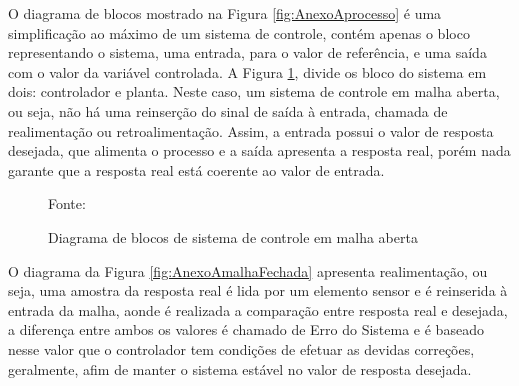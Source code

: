 O diagrama de blocos mostrado na Figura \ref{fig:AnexoAprocesso} é uma simplificação ao máximo de um sistema de controle, contém apenas o bloco representando o sistema, uma entrada, para o valor de referência, e uma saída com o valor da variável controlada. A Figura \ref{fig:AnexoAmalhaAberta}, divide os bloco do sistema em dois: controlador e planta. Neste caso, um sistema de controle em malha aberta, ou seja, não há uma reinserção do sinal de saída à entrada, chamada de realimentação ou retroalimentação. Assim, a entrada possui o valor de resposta desejada, que alimenta o processo e a saída apresenta a resposta real, porém nada garante que a resposta real está coerente ao valor de entrada.

\begin{figure}[!htb]
\centering
\caption{ Diagrama de blocos de sistema de controle em malha aberta}
\label{fig:AnexoAmalhaAberta}

{\small Fonte: \cite{Ogata}}
\end{figure}

O diagrama da Figura \ref{fig:AnexoAmalhaFechada} apresenta realimentação, ou seja, uma amostra da resposta real é lida por um elemento sensor e é reinserida à entrada da malha, aonde é realizada a comparação entre resposta real e desejada, a diferença entre ambos os valores é chamado de Erro do Sistema e é baseado nesse valor que o controlador tem condições de efetuar as devidas correções, geralmente, afim de manter o sistema estável no valor de resposta desejada.

